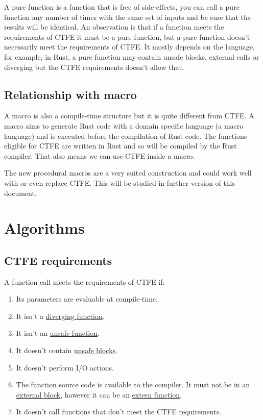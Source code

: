 \documentclass[a4paper,11pt]{article}
\begin{document}
A pure function is a function that is free of side-effects, you can call a pure function any number of times with the same set of inputs and be sure that the results will be identical. An observation is that if a function meets the requirements of CTFE it must be a pure function, but a pure function doesn't necessarily meet the requirements of CTFE. It mostly depends on the language, for example, in Rust, a pure function may contain unsafe blocks, external calls or diverging but the CTFE requirements doesn't allow that.

\subsection{Relationship with macro}
\label{relation-macro}

A macro is also a compile-time structure but it is quite different from CTFE. A macro aims to generate Rust code with a domain specific language (a macro language) and is executed before the compilation of Rust code. The functions eligible for CTFE are written in Rust and so will be compiled by the Rust compiler. That also means we can use CTFE inside a macro.
\newline

The new procedural macros are a very suited construction and could work well with or even replace CTFE. This will be studied in further version of this document.

\section{Algorithms}

\subsection{CTFE requirements}
\label{ctfe-requirements}

A function call meets the requirements of CTFE if:

\begin{enumerate}
\item Its parameters are evaluable at compile-time.
\item It isn't a \href{http://static.rust-lang.org/doc/master/rust.html#diverging-functions}{diverging function}.
\item It isn't an \href{http://static.rust-lang.org/doc/master/rust.html#unsafe-functions}{unsafe function}.
\item It doesn't contain \href{http://static.rust-lang.org/doc/master/rust.html#unsafe-blocks}{unsafe blocks}.
\item It doesn't perform I/O actions.
\item The function source code is available to the compiler. It must not be in an \href{http://static.rust-lang.org/doc/master/rust.html#external-blocks}{external block}, however it can be an \href{http://static.rust-lang.org/doc/master/rust.html#extern-functions}{extern function}.
\item It doesn't call functions that don't meet the CTFE requirements.
\end{enumerate}
\end{document}
